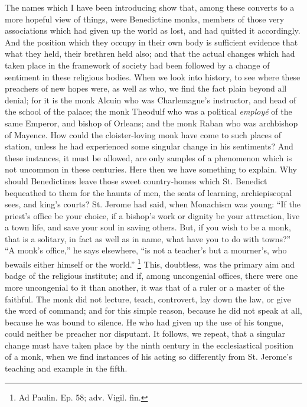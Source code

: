 The names which I have been introducing show that, among these
converts to a more hopeful view of things, were Benedictine monks,
members of those very associations which had given up the world as
lost, and had quitted it accordingly. And the position which
they occupy in their own body is sufficient evidence that what they
held, their brethren held also; and that the actual changes which had
taken place in the framework of society had been followed by a change
of sentiment in these religious bodies. When we look into history, to
see where these preachers of new hopes were, as well as who, we find
the fact plain beyond all denial; for it is the monk Alcuin who was
Charlemagne's instructor, and head of the school of the palace; the
monk Theodulf who was a political \emph{employé} of the same Emperor,
and bishop of Orleans; and the monk Raban who was archbishop of
Mayence. How could the cloister-loving monk have come to such places
of station, unless he had experienced some singular change in his
sentiments? And these instances, it must be allowed, are only samples
of a phenomenon which is not uncommon in these centuries. Here then we
have something to explain. Why should Benedictines leave those sweet
country-homes which St. Benedict bequeathed to them for the haunts of
men, the seats of learning, archiepiscopal sees, and king's courts?
St. Jerome had said, when Monachism was young: ``If the priest's
office be your choice, if a bishop's work or dignity be your
attraction, live a town life, and save your soul in saving others.
But, if you wish to be a monk, that is a solitary, in fact as well as
in name, what have you to do with towns?'' ``A monk's
office,'' he says elsewhere, ``is not a teacher's but a
mourner's, who bewails either himself or the world.'' \footnote{Ad Paulin. Ep.
58; adv. Vigil. fin.} This, doubtless, was the primary aim and badge of the religious
institute; and if, among uncongenial offices, there were one more
uncongenial to it than another, it was that of a ruler or a master of
the faithful. The monk did not lecture, teach, controvert, lay
down the law, or give the word of command; and for this simple reason,
because he did not speak at all, because he was bound to silence. He
who had given up the use of his tongue, could neither be preacher nor
disputant. It follows, we repeat, that a singular change must have
taken place by the ninth century in the ecclesiastical position of a
monk, when we find instances of his acting so differently from St.
Jerome's teaching and example in the fifth.

